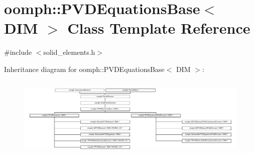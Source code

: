 \hypertarget{classoomph_1_1PVDEquationsBase}{}\section{oomph\+:\+:P\+V\+D\+Equations\+Base$<$ D\+IM $>$ Class Template Reference}
\label{classoomph_1_1PVDEquationsBase}


{\ttfamily \#include $<$solid\+\_\+elements.\+h$>$}

Inheritance diagram for oomph\+:\+:P\+V\+D\+Equations\+Base$<$ D\+IM $>$\+:\begin{figure}[H]
\begin{center}
\leavevmode
\includegraphics[height=3.954802cm]{classoomph_1_1PVDEquationsBase}
\end{center}
\end{figure}
